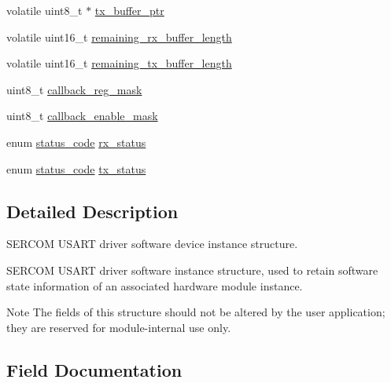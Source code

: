 \begin{DoxyCompactItemize}
volatile uint8\+\_\+t $\ast$ \mbox{\hyperlink{structusart__module_ad4f5e977169e703291bab5e3483ff5dd}{tx\+\_\+buffer\+\_\+ptr}}
\item 
volatile uint16\+\_\+t \mbox{\hyperlink{structusart__module_adbc4f86e8d157a19a354c981e1486865}{remaining\+\_\+rx\+\_\+buffer\+\_\+length}}
\item 
volatile uint16\+\_\+t \mbox{\hyperlink{structusart__module_a8031a02be57635012242eb4c9fb21934}{remaining\+\_\+tx\+\_\+buffer\+\_\+length}}
\item 
uint8\+\_\+t \mbox{\hyperlink{structusart__module_aca598a13daa631f2acaf10fd14cddd9b}{callback\+\_\+reg\+\_\+mask}}
\item 
uint8\+\_\+t \mbox{\hyperlink{structusart__module_afad7acb8781b0158f430dbd3eec23325}{callback\+\_\+enable\+\_\+mask}}
\item 
enum \mbox{\hyperlink{group__group__sam0__utils__status__codes_ga751c892e5a46b8e7d282085a5a5bf151}{status\+\_\+code}} \mbox{\hyperlink{structusart__module_a8ffaa16cd35ae2c8e84e357f35ef5aff}{rx\+\_\+status}}
\item 
enum \mbox{\hyperlink{group__group__sam0__utils__status__codes_ga751c892e5a46b8e7d282085a5a5bf151}{status\+\_\+code}} \mbox{\hyperlink{structusart__module_af379c1d4517e118aa4b38c987c7f6d1e}{tx\+\_\+status}}
\end{DoxyCompactItemize}


\subsection{Detailed Description}
S\+E\+R\+C\+OM U\+S\+A\+RT driver software device instance structure. 

S\+E\+R\+C\+OM U\+S\+A\+RT driver software instance structure, used to retain software state information of an associated hardware module instance.

\begin{DoxyNote}{Note}
The fields of this structure should not be altered by the user application; they are reserved for module-\/internal use only. 
\end{DoxyNote}


\subsection{Field Documentation}
\mbox{\label{structusart__module_acb4f50636ea728b711008ba58b2e3ecc}} 
